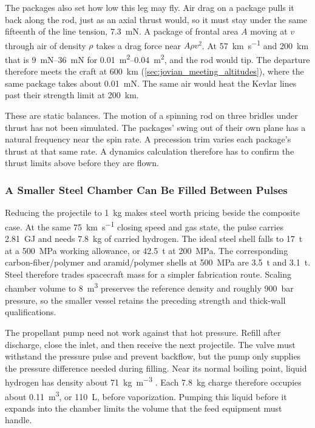 \documentclass{article}
\begin{document}
The packages also set how low this leg may fly. Air drag on a package pulls it back along the rod, just as an axial thrust would, so it must stay under the same fifteenth of the line tension, \SI{7.3}{\milli\newton}. A package of frontal area $A$ moving at $v$ through air of density $\rho$ takes a drag force near $A\rho v^2$. At \SI{57}{\kilo\meter\per\second} and \SI{200}{\kilo\meter} that is \SIrange{9}{36}{\milli\newton} for \SIrange{0.01}{0.04}{\square\meter}, and the rod would tip. The departure therefore meets the craft at \SI{600}{\kilo\meter} (\autoref{sec:jovian_meeting_altitudes}), where the same package takes about \SI{0.01}{\milli\newton}. The same air would heat the Kevlar lines past their strength limit at \SI{200}{\kilo\meter}.

These are static balances. The motion of a spinning rod on three bridles under thrust has not been simulated. The packages' swing out of their own plane has a natural frequency near the spin rate. A precession trim varies each package's thrust at that same rate. A dynamics calculation therefore has to confirm the thrust limits above before they are flown.

\subsubsection{A Smaller Steel Chamber Can Be Filled Between Pulses}\label{sec:batch_filled_steel}

Reducing the projectile to \SI{1}{\kilogram} makes steel worth pricing beside the composite case. At the same \SI{75}{\kilo\meter\per\second} closing speed and gas state, the pulse carries \SI{2.81}{\giga\joule} and needs \SI{7.8}{\kilogram} of carried hydrogen. The ideal steel shell falls to \SI{17}{\tonne} at a \SI{500}{\mega\pascal} working allowance, or \SI{42.5}{\tonne} at \SI{200}{\mega\pascal}. The corresponding carbon-fiber/polymer and aramid/polymer shells at \SI{500}{\mega\pascal} are \SI{3.5}{\tonne} and \SI{3.1}{\tonne}. Steel therefore trades spacecraft mass for a simpler fabrication route. Scaling chamber volume to \SI{8}{\cubic\meter} preserves the reference density and roughly \SI{900}{\bar} pressure, so the smaller vessel retains the preceding strength and thick-wall qualifications.

The propellant pump need not work against that hot pressure. Refill after discharge, close the inlet, and then receive the next projectile. The valve must withstand the pressure pulse and prevent backflow, but the pump only supplies the pressure difference needed during filling. Near its normal boiling point, liquid hydrogen has density about \SI{71}{\kilogram\per\cubic\meter} \cite{nist_webbook_hydrogen}. Each \SI{7.8}{\kilogram} charge therefore occupies about \SI{0.11}{\cubic\meter}, or \SI{110}{\liter}, before vaporization. Pumping this liquid before it expands into the chamber limits the volume that the feed equipment must handle.
\end{document}

